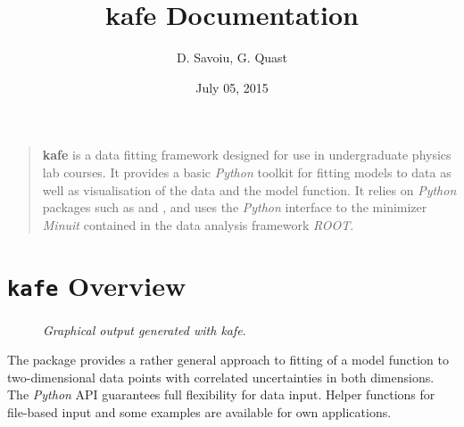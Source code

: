 \documentclass[a4paper,10pt,english]{sphinxmanual}
\title{kafe Documentation}
\date{July 05, 2015}
\author{D. Savoiu, G. Quast}
\begin{document}
\maketitle
\tableofcontents
{}\label{index::doc}

\begin{quote}

\textbf{kafe} is a data fitting framework designed for use in undergraduate
physics lab courses. It provides a basic \emph{Python} toolkit for fitting
models to data as well as visualisation of the data and the model function.
It relies on \emph{Python} packages such as  and ,
and uses the \emph{Python} interface to the minimizer \emph{Minuit} contained in the data
analysis framework \emph{ROOT}.
\end{quote}


\chapter{\texttt{kafe} Overview}
\label{index:welcome-to-kafe-karlsruhe-fit-environment}\label{index:kafe-overview}\begin{figure}[htbp]\begin{flushright}
\capstart

\caption{\emph{Graphical output generated with kafe}.}\end{flushright}\end{figure}

The  package provides a rather general approach to fitting of
a model function to two-dimensional data points with correlated uncertainties
in both dimensions. The \emph{Python} API guarantees full flexibility
for data input. Helper functions for file-based input and some
examples are available for own applications.
\end{document}
